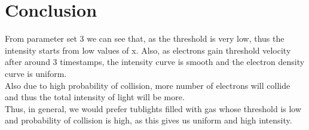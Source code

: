 \documentclass[11pt, a4paper]{article}
\begin{document}
\section{Conclusion}
From parameter set 3 we can see that, as the threshold is very low, thus the intensity starts from low values of x. Also, as electrons gain threshold velocity after around 3 timestamps, the intensity curve is smooth and the electron density curve is uniform.\\

Also due to high probability of collision, more number of electrons will collide and thus the total intensity of light will be more.\\

Thus, in general, we would prefer tublights filled with gas whose threshold is low and probability of collision is high, as this gives us uniform and high intensity.
\end{document}
